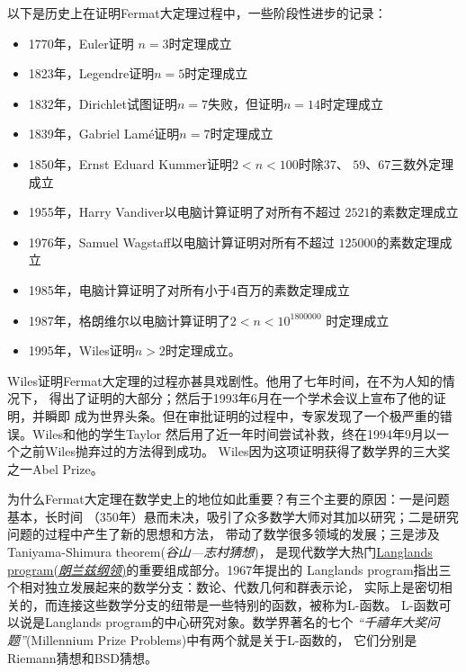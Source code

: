 \begin{shaded}
	以下是历史上在证明Fermat大定理过程中，一些阶段性进步的记录：
	\begin{itemize}
	  \item 1770年，Euler证明 $n=3$时定理成立
	  \item 1823年，Legendre证明$n=5$时定理成立
      \item 1832年，Dirichlet试图证明$n=7$失败，但证明$n=14$时定理成立
	  \item 1839年，Gabriel Lamé证明$n=7$时定理成立
	  \item 1850年，Ernst Eduard Kummer证明$2<n<100$时除$37$、
	  $59$、$67$三数外定理成立
	  \item 1955年，Harry Vandiver以电脑计算证明了对所有不超过
	  $2521$的素数定理成立
	  \item 1976年，Samuel Wagstaff以电脑计算证明对所有不超过
	  $125000$的素数定理成立
	  \item 1985年，电脑计算证明了对所有小于$4$百万的素数定理成立
	  \item 1987年，格朗维尔以电脑计算证明了$2<n<10^{{1800000}}$
	  时定理成立
	  \item 1995年，Wiles证明$n>2$时定理成立。
	\end{itemize}
	
	Wiles证明Fermat大定理的过程亦甚具戏剧性。他用了七年时间，在不为人知的情况下，
	得出了证明的大部分；然后于1993年6月在一个学术会议上宣布了他的证明，并瞬即
	成为世界头条。但在审批证明的过程中，专家发现了一个极严重的错误。Wiles和他的学生Taylor
	然后用了近一年时间尝试补救，终在1994年9月以一个之前Wiles抛弃过的方法得到成功。
	Wiles因为这项证明获得了数学界的三大奖之一Abel Prize。
	
	为什么Fermat大定理在数学史上的地位如此重要？有三个主要的原因：一是问题基本，长时间
	（350年）悬而未决，吸引了众多数学大师对其加以研究；二是研究问题的过程中产生了新的思想和方法，
	带动了数学很多领域的发展；三是涉及Taniyama-Shimura theorem({\it 谷山—志村猜想})，
	是现代数学大热门\href{https://en.wikipedia.org/wiki/Langlands_program}
	{Langlands program({\it 朗兰兹纲领})}的重要组成部分。1967年提出的
	Langlands program指出三个相对独立发展起来的数学分支：数论、代数几何和群表示论，
	实际上是密切相关的，而连接这些数学分支的纽带是一些特别的函数，被称为L-函数。
	L-函数可以说是Langlands program的中心研究对象。数学界著名的七个
	{\it “千禧年大奖问题”}(Millennium Prize Problems)中有两个就是关于L-函数的，
	它们分别是{\kaishu Riemann猜想}和{\kaishu BSD猜想}。
	

\end{shaded}
